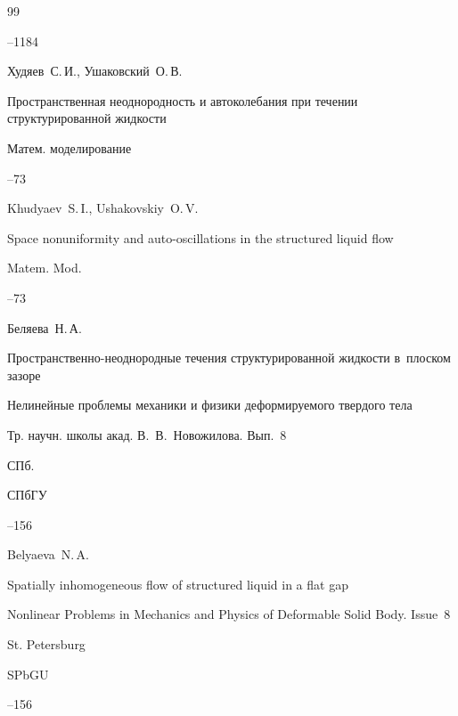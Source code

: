 \begin{thebibliography}{99}

--1184




\by Худяев~С.\,И., Ушаковский~О.\,В.

\paper Пространственная неоднородность и автоколебания при течении структурированной жидкости

\jour Матем. моделирование




--73

\misctransl

\by Khudyaev~S.\,I., Ushakovskiy~O.\,V.

\paper Space nonuniformity and auto-oscillations in the structured liquid flow

\jour Matem. Mod.




--73






\by Беляева~Н.\,А.

\paper Пространственно-неоднородные течения структурированной жидкости в~плоском зазоре

\inbook Нелинейные проблемы механики и физики деформируемого твердого тела

\bookinfo Тр. научн. школы акад. В.~В.~Новожилова. Вып.~8

\publaddr СПб.

\publ СПбГУ


--156

\misctransl

\by Belyaeva~N.\,A.

\paper Spatially inhomogeneous flow of structured liquid in a flat gap

\inbook Nonlinear Problems in Mechanics and Physics of Deformable Solid Body. \rm Issue~8

\publaddr St. Petersburg

\publ SPbGU


--156






\end{thebibliography}
